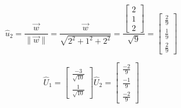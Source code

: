\documentclass[12pt]{article}
\begin{document}
\[ \hat u_2 = \frac{\vec{w}}{ \lVert \vec{w} \rVert } 
= \frac{\vec{w}}{ \sqrt{2^2 + 1^2 + 2^2} }
= \frac{\begin{bmatrix} 2 \\ 1 \\ 2 \end{bmatrix}}{ \sqrt{9} }
= \begin{bmatrix} \frac{2}{9} \\ \frac{1}{9} \\ \frac{2}{9} \end{bmatrix} \]

\[ \hat U_1 = \begin{bmatrix} \frac{-3}{\sqrt{10}} \\ \frac{1}{\sqrt{10}} \end{bmatrix}
\hat U_2 = 
\begin{bmatrix} \frac{-2}{9} \\ \frac{-1}{9} \\ \frac{-2}{9} \end{bmatrix} 
\]
\end{document}
